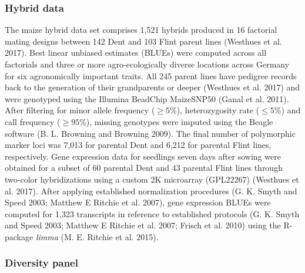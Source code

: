 \documentclass[]{elsarticle} %
\begin{document}
\subsubsection{Hybrid data}\label{hybrid-data}

The maize hybrid data set comprises 1,521 hybrids produced in 16
factorial mating designs between 142 Dent and 103 Flint parent lines
(Westhues et al. 2017). Best linear unbiased estimates (BLUEs) were
computed across all factorials and three or more agro-ecologically
diverse locations across Germany for six agronomically important traits.
All 245 parent lines have pedigree records back to the generation of
their grandparents or deeper (Westhues et al. 2017) and were genotyped
using the Illumina BeadChip MaizeSNP50 (Ganal et al. 2011). After
filtering for minor allele frequency (\(\geq 5\)\%), heterozygosity rate
(\(\leq 5\)\%) and call frequency (\(\geq 95\)\%), missing genotypes
were imputed using the Beagle software (B. L. Browning and Browning
2009). The final number of polymorphic marker loci was 7,013 for
parental Dent and 6,212 for parental Flint lines, respectively. Gene
expression data for seedlings seven days after sowing were obtained for
a subset of 60 parental Dent and 43 parental Flint lines through
two-color hybridizations using a custom 2K microarray (GPL22267)
(Westhues et al. 2017). After applying established normalization
procedures (G. K. Smyth and Speed 2003; Matthew E Ritchie et al. 2007),
gene expression BLUEs were computed for 1,323 transcripts in reference
to established protocols (G. K. Smyth and Speed 2003; Matthew E Ritchie
et al. 2007; Frisch et al. 2010) using the R-package \emph{limma} (M. E.
Ritchie et al. 2015).

\subsubsection{Diversity panel}\label{diversity-panel}
\end{document}
